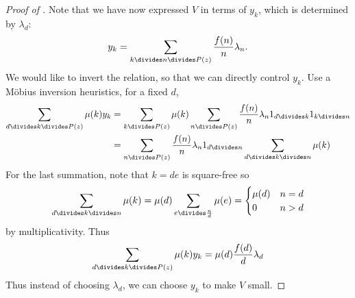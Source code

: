 \documentclass[a4paper]{article}
\begin{document}
\begin{proof}[Proof of ]
  Note that we have now expressed \(V\) in terms of \(y_k\), which is determined by \(\lambda_d\):
  \[
    y_k = \sum_{k \divides n \divides P(z)} \frac{f(n)}{n} \lambda_n.
  \]
  We would like to invert the relation, so that we can directly control \(y_k\). Use a Möbius inversion heuristics, for a fixed \(d\),
  \begin{align*}
    \sum_{d \divides k \divides P(z)} \mu(k) y_k
    &= \sum_{k \divides P(z)} \mu(k) \sum_{n \divides P(z)} \frac{f(n)}{n} \lambda_n 1_{d \divides k} 1_{k \divides n} \\
    &= \sum_{n \divides P(z)} \frac{f(n)}{n} \lambda_n 1_{d \divides n} \sum_{d \divides k \divides n} \mu(k)
  \end{align*}
  For the last summation, note that \(k = de\) is square-free so
  \[
    \sum_{d \divides k \divides n} \mu(k)
    = \mu(d) \sum_{e \divides \frac{n}{d}} \mu(e)
    =
    \begin{cases}
      \mu(d) & n = d \\
      0 & n > d
    \end{cases}
  \]
  by multiplicativity. Thus
  \[
    \sum_{d \divides k \divides P(z)} \mu(k) y_k
    = \mu(d) \frac{f(d)}{d} \lambda_d
  \]
  Thus instead of choosing \(\lambda_d\), we can choose \(y_k\) to make \(V\) small.


\end{proof}
\end{document}
